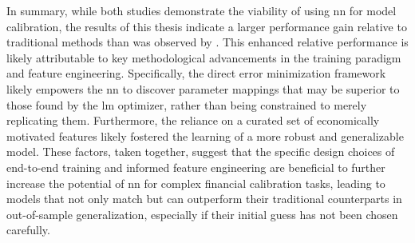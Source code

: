 In summary, while both studies demonstrate the viability of using \ac{nn} for model calibration, the results of this thesis indicate a larger performance gain relative to traditional methods than was observed by \textcite{hernandez2016model}. This enhanced relative performance is likely attributable to key methodological advancements in the training paradigm and feature engineering. Specifically, the direct error minimization framework likely empowers the \ac{nn} to discover parameter mappings that may be superior to those found by the \ac{lm} optimizer, rather than being constrained to merely replicating them. Furthermore, the reliance on a curated set of economically motivated features likely fostered the learning of a more robust and generalizable model. These factors, taken together, suggest that the specific design choices of end-to-end training and informed feature engineering are beneficial to further increase the potential of \ac{nn} for complex financial calibration tasks, leading to models that not only match but can outperform their traditional counterparts in out-of-sample generalization, especially if their initial guess has not been chosen carefully.